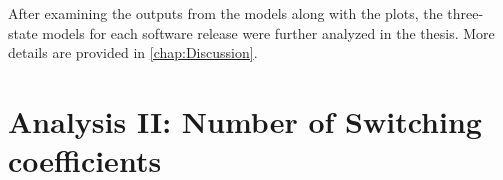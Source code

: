 After examining the outputs from the models along with the plots,
the three-state models for each software release were further analyzed
in the thesis. More details are provided in \ref{chap:Discussion}.

\section{Analysis II: Number of Switching coefficients \label{sec:Switching}}

